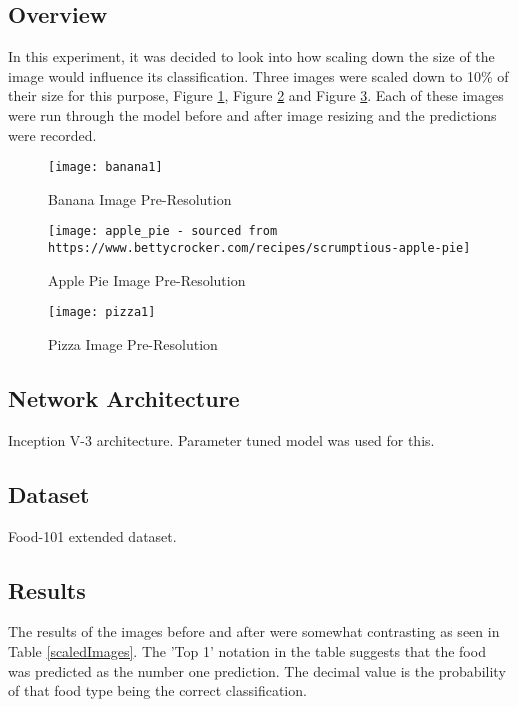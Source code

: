 \subsection*{Overview}
In this experiment, it was decided to look into how scaling down the size of the image would influence its classification. Three images were scaled down to 10\% of their size for this purpose, Figure \ref{fig:bananaPreRes}, Figure \ref{fig:apple_piePreRes} and Figure \ref{fig:pizzaPreRes}. Each of these images were run through the model before and after image resizing and the predictions were recorded.

\begin{figure}
	\centering
    \texttt{[image: banana1]}
    \caption{Banana Image Pre-Resolution}
    \label{fig:bananaPreRes}
\end{figure}

\begin{figure}
	\centering
    \texttt{[image: apple\_pie - sourced from https://www.bettycrocker.com/recipes/scrumptious-apple-pie]}
    \caption{Apple Pie Image Pre-Resolution}
    \label{fig:apple_piePreRes}
\end{figure}

\begin{figure}	
	\centering
    \texttt{[image: pizza1]}
    \caption{Pizza Image Pre-Resolution}
    \label{fig:pizzaPreRes}
\end{figure}

\subsection*{Network Architecture}
Inception V-3 architecture. Parameter tuned model was used for this.

\subsection*{Dataset}
Food-101 extended dataset.

\subsection*{Results}
The results of the images before and after were somewhat contrasting as seen in Table \ref{scaledImages}.
The 'Top 1' notation in the table suggests that the food was predicted as the number one prediction. The decimal value is the probability of that food type being the correct classification.

